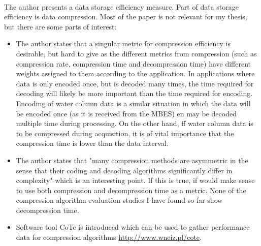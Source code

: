 \cite{swacha2008assessing}\\

The author presents a data storage efficiency measure. Part of data storage efficiency is data compression. Most of the paper is not relevant for my thesis, but there are some parts of interest:
\begin{itemize}
\item The author states that a singular metric for compression efficiency is desirable, but hard to give as the different metrics from compression (such as compression rate, compression time and decompression time) have different weights assigned to them according to the application. In applications where data is only encoded once, but is decoded many times, the time required for decoding will likely be more important than the time required for encoding. Encoding of water column data is a similar situation in which the data will be encoded once (as it is received from the MBES) en may be decoded multiple time during processing. On the other hand, ff water column data is to be compressed during acquisition, it is of vital importance that the compression time is lower than the data interval.
\item The author states that "many compression methods are asymmetric in the sense that their coding and decoding algorithms significantly differ in complexity" which is an interesting point. If this is true, if would make sense to use both compression and decompression time as a metric. None of the compression algorithm evaluation studies I have found so far show decompression time.
\item Software tool CoTe is introduced which can be used to gather performance data for compression algorithms \url{http://www.wneiz.pl/cote}.
\end{itemize}